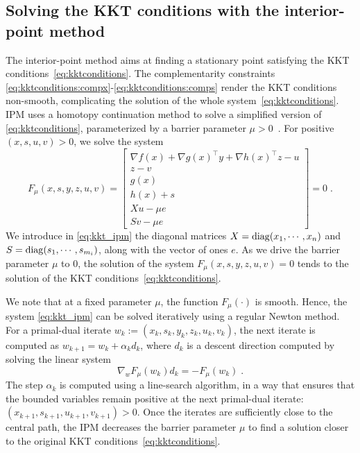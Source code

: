 \subsection{Solving the KKT conditions with the interior-point method}
\label{sec:ipm:kkt}
The interior-point method aims at finding a stationary point
satisfying the KKT conditions~\eqref{eq:kktconditions}.
The complementarity constraints \eqref{eq:kktconditions:compx}-\eqref{eq:kktconditions:comps}
render the KKT conditions non-smooth, complicating the solution of
the whole system~\eqref{eq:kktconditions}.
IPM uses a homotopy continuation method to solve a simplified
version of \eqref{eq:kktconditions}, parameterized by a barrier
parameter $\mu > 0$~\cite[Chapter 19]{nocedal_numerical_2006}.
For positive $(x, s, u, v) > 0$, we solve the system
\begin{equation}
  \label{eq:kkt_ipm}
  F_\mu(x, s, y, z, u, v) =
  \begin{bmatrix}
       \nabla f(x) + \nabla g(x)^\top y + \nabla h(x)^\top z - u  \\
       z - v  \\
       g(x)  \\
       h(x) + s  \\
       X u - \mu e  \\
       S v - \mu e
  \end{bmatrix} = 0
   \; .
\end{equation}
We introduce in \eqref{eq:kkt_ipm} the diagonal matrices $X = \operatorname{diag}(x_1, \cdots, x_n)$
and $S = \operatorname{diag}(s_1, \cdots, s_{m_i})$, along with the vector of ones $e$.
As we drive the barrier parameter $\mu$ to $0$, the solution of the
system $F_\mu(x, s, y, z, u, v) = 0$ tends to the solution of the
KKT conditions~\eqref{eq:kktconditions}.

We note that at a fixed parameter $\mu$, the function $F_\mu(\cdot)$
is smooth. Hence, the system \eqref{eq:kkt_ipm} can be solved iteratively
using a regular Newton method. For a primal-dual iterate
$w_k := (x_k, s_k, y_k, z_k, u_k, v_k)$, the next iterate is computed as
$w_{k+1} = w_k + \alpha_k d_k$, where $d_k$ is a descent
direction computed by solving the linear system
\begin{equation}
  \label{eq:newton_step}
  \nabla_w F_{\mu}(w_k) d_k = -F_{\mu}(w_k) \; .
\end{equation}
The step $\alpha_k$ is computed using a line-search algorithm, in a way
that ensures that the bounded variables remain positive
at the next primal-dual iterate: $(x_{k+1}, s_{k+1}, u_{k+1}, v_{k+1}) > 0$.
Once the iterates are sufficiently close to the central path,
the IPM decreases the barrier parameter $\mu$ to find a solution closer to
the original KKT conditions~\eqref{eq:kktconditions}.

